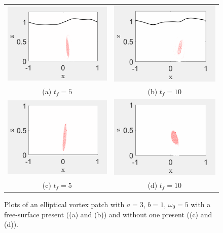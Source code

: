 \documentclass[a4paper,11pt]{article}
\begin{document}
\begin{figure}[!h]
\begin{tabular}{cc}
\includegraphics[width=.5\textwidth]{rows_200_cols_400_K_128_mu_pt01_gam_pt031623_F_023843_tf_5.png}	& \includegraphics[width=.5\textwidth]{rows_200_cols_400_K_128_mu_pt01_gam_pt031623_F_023843_tf_10.png}\\
(a) $t_{f}=5$ & (b) $t_{f}=10$\\
\includegraphics[width=.5\textwidth]{rows_200_cols_400_mu_pt01_gam_pt031623_F_023843_tf_5.png}	& \includegraphics[width=.5\textwidth]{rows_200_cols_400_mu_pt01_gam_pt031623_F_023843_tf_10.png}\\
(c) $t_{f}=5$& (d) $t_{f}=10$
\end{tabular}	
\caption{Plots of an elliptical vortex patch with $a=3$, $b=1$, $\omega_{0}=5$ with a free-surface present ((a) and (b)) and without one present ((c) and (d)).  }
\label{fig:vortprofilesinstab}
\end{figure}  


\end{document}
